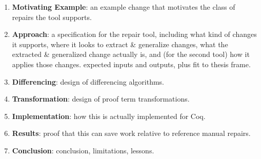 \begin{enumerate}
\item \textbf{Motivating Example}: an example change that motivates the class of repairs the tool supports.
\item \textbf{Approach}: a specification for the repair tool, including what kind of changes it supports, where it looks to extract \& generalize changes, what the extracted
\& generalized change actually is, and (for the second tool) how it applies those changes. expected inputs and outputs, plus fit to thesis frame.
\item \textbf{Differencing}: design of differencing algorithms.
\item \textbf{Transformation}: design of proof term transformations.
\item \textbf{Implementation}: how this is actually implemented for Coq.
\item \textbf{Results}: proof that this can save work relative to reference manual repairs.
\item \textbf{Conclusion}: conclusion, limitations, lessons.
\end{enumerate}

